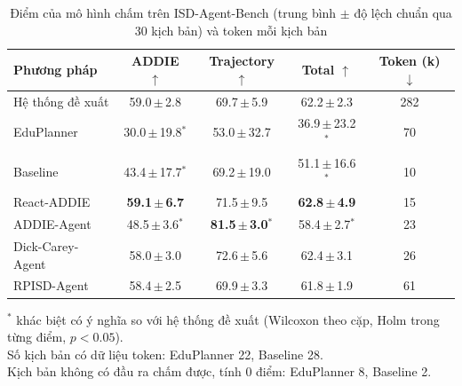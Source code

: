 \begin{table}[t]
  \caption{Điểm của mô hình chấm trên ISD-Agent-Bench (trung bình $\pm$ độ lệch chuẩn qua 30 kịch bản) và token mỗi kịch bản}
  \label{tab:judge}
  \centering
  \footnotesize
  \setlength{\tabcolsep}{2.5pt}
  \begin{tabular}{@{}lcccc@{}}
    \toprule
    Phương pháp & ADDIE $\uparrow$ & Trajectory $\uparrow$ & Total $\uparrow$ & Token (k) $\downarrow$ \\
    \midrule
    Hệ thống đề xuất & 59.0\,$\pm$\,2.8 & 69.7\,$\pm$\,5.9 & 62.2\,$\pm$\,2.3 & 282 \\
    EduPlanner & 30.0\,$\pm$\,19.8$^{*}$ & 53.0\,$\pm$\,32.7 & 36.9\,$\pm$\,23.2$^{*}$ & 70 \\
    Baseline & 43.4\,$\pm$\,17.7$^{*}$ & 69.2\,$\pm$\,19.0 & 51.1\,$\pm$\,16.6$^{*}$ & 10 \\
    React-ADDIE & \textbf{59.1\,$\pm$\,6.7} & 71.5\,$\pm$\,9.5 & \textbf{62.8\,$\pm$\,4.9} & 15 \\
    ADDIE-Agent & 48.5\,$\pm$\,3.6$^{*}$ & \textbf{81.5\,$\pm$\,3.0$^{*}$} & 58.4\,$\pm$\,2.7$^{*}$ & 23 \\
    Dick-Carey-Agent & 58.0\,$\pm$\,3.0 & 72.6\,$\pm$\,5.6 & 62.4\,$\pm$\,3.1 & 26 \\
    RPISD-Agent & 58.4\,$\pm$\,2.5 & 69.9\,$\pm$\,3.3 & 61.8\,$\pm$\,1.9 & 61 \\
    \bottomrule
  \end{tabular}
  \par\vspace{2pt}
  {\scriptsize\raggedright $^{*}$ khác biệt có ý nghĩa so với hệ thống đề xuất (Wilcoxon theo cặp, Holm trong từng điểm, $p<0.05$).\\ Số kịch bản có dữ liệu token: EduPlanner 22, Baseline 28.\\ Kịch bản không có đầu ra chấm được, tính 0 điểm: EduPlanner 8, Baseline 2.\par}
\end{table}
